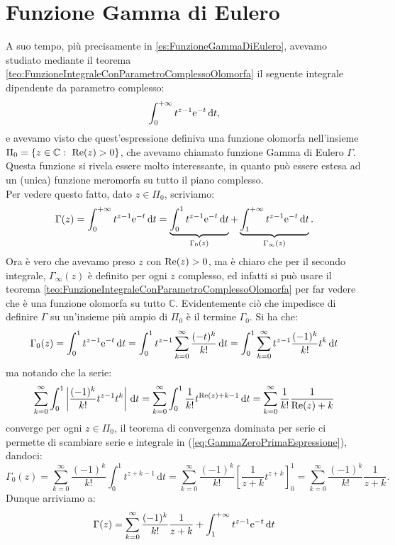 \documentclass[11pt]{book}
\theoremstyle{Definizione}
\theoremstyle{TeoremaProposizioneLemmaCorollarioCongettura}
\theoremstyle{OsservazioneNotaEsempio}
\newcommand{\C}{\mathbb{C}}
\renewcommand{\Re}{\textup{Re}}
\newcommand{\e}{\textup{e}}
\renewcommand{\d}{\mathrm{d}}
\newcommand{\dt}{\,\d t}
\begin{document}
\section{Funzione Gamma di Eulero}
A suo tempo, più precisamente in \ref{es:FunzioneGammaDiEulero}, avevamo studiato mediante il teorema \ref{teo:FunzioneIntegraleConParametroComplessoOlomorfa} il seguente integrale dipendente da parametro complesso:
$$
\int_0^{+\infty} t^{z-1}\e^{-t}\dt,
$$
e avevamo visto che quest'espressione definiva una funzione olomorfa nell'insieme $\Pi_0 = \{z\in \C:\ \Re(z) > 0\}$, che avevamo chiamato funzione Gamma di Eulero $\Gamma$.\\
Questa funzione si rivela essere molto interessante, in quanto può essere estesa ad un (unica) funzione meromorfa su tutto il piano complesso.\\
Per vedere questo fatto, dato $z\in \Pi_0$, scriviamo:
$$
\Gamma(z) = \int_0^{+\infty} t^{z-1}\e^{-t}\dt = \underbrace{\int_{0}^{1} t^{z-1}\e^{-t}\dt}_{\Gamma_0(z)} + \underbrace{\int_1^{+\infty} t^{z-1}\e^{-t}\dt}_{\Gamma_\infty(z)}.
$$
Ora è vero che avevamo preso $z$ con $\Re(z) > 0$, ma è chiaro che per il secondo integrale, $\Gamma_\infty(z)$ è definito per ogni $z$ complesso, ed infatti si può usare il teorema \ref{teo:FunzioneIntegraleConParametroComplessoOlomorfa} per far vedere che è una funzione olomorfa su tutto $\C$. Evidentemente ciò che impedisce di definire $\Gamma$ su un'insieme più ampio di $\Pi_0$ è il termine $\Gamma_0$.
Si ha che:
\begin{equation}\label{eq:GammaZeroPrimaEspressione}
\Gamma_0(z) = \int_0^1 t^{z-1}\e^{-t}\dt = \int_0^1 t^{z-1}\sum_{k = 0}^\infty \frac{(-t)^k}{k!} \dt= \int_0^{1} \sum_{k = 0}^\infty t^{z-1}\frac{(-1)^k}{k!}t^k\dt
\end{equation}
ma notando che la serie:
$$
\sum_{k = 0}^\infty \int_{0}^{1} \left|\frac{(-1)^k}{k!}t^{z-1}t^k\right|\dt = \sum_{k = 0}^\infty \int_{0}^{1} \frac{1}{k!}t^{\Re(z)+k-1}\dt = \sum_{k = 0}^\infty \frac{1}{k!}\frac{1}{\Re(z)+k}
$$
converge per ogni $z\in \Pi_0$, il teorema di convergenza dominata per serie ci permette di scambiare serie e integrale in (\ref{eq:GammaZeroPrimaEspressione}), dandoci:
$$
\Gamma_0(z) = \sum_{k = 0}^\infty \frac{(-1)^k}{k!}\int_0^{1}t^{z+k-1}\dt = \sum_{k = 0}^\infty \frac{(-1)^k}{k!} \left[\frac{1}{z+k}t^{z+k}\right]_0^{1} = \sum_{k = 0}^\infty \frac{(-1)^k}{k!} \frac{1}{z+k}.
$$
Dunque arriviamo a:
\begin{equation}\label{eq:FunzioneGammaSeriePiùIntegrale}
\Gamma(z) = \sum_{k = 0}^{\infty}\frac{(-1)^k}{k!}\frac{1}{z+k} + \int_1^{+\infty} t^{z-1}\e^{-t}\dt
\end{equation}
\end{document}
